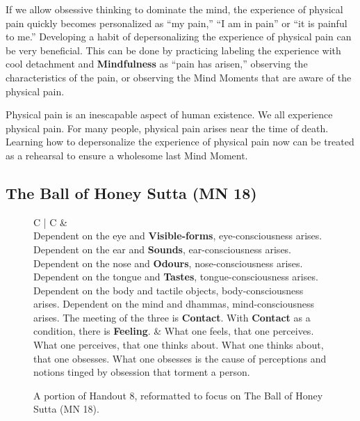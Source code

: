 If we allow obsessive thinking to dominate the mind, the experience of physical pain quickly becomes personalized as “my pain,” “I am in pain” or “it is painful to me.” Developing a habit of depersonalizing the experience of physical pain can be very beneficial. This can be done by practicing labeling the experience with cool detachment and \textbf{Mindfulness} as “pain has arisen,” observing the characteristics of the pain, or observing the Mind Moments that are aware of the physical pain.

Physical pain is an inescapable aspect of human existence. We all experience physical pain. For many people, physical pain arises near the time of death. Learning how to depersonalize the experience of physical pain now can be treated as a rehearsal to ensure a wholesome last Mind Moment.

\subsection*{The Ball of Honey Sutta (MN 18)}

\begin{figure}[H]
\begin{tabular*}{\textwidth}{C{\tabcolsep} | C{\tabcolsep}}
\toprule
{} &  \\
\midrule
 Dependent on the eye and \textbf{Visible-forms}, eye-consciousness arises.\newline
 Dependent on the ear and \textbf{Sounds}, ear-consciousness arises.\newline
 Dependent on the nose and \textbf{Odours}, nose-consciousness arises.\newline
 Dependent on the tongue and \textbf{Tastes}, tongue-consciousness arises.\newline
 Dependent on the body and tactile objects, body-consciousness arises.\newline
 Dependent on the mind and dhammas, mind-consciousness arises.
 \newline\vspace{5mm}
 The meeting of the three is \textbf{Contact}.
 \newline\vspace{5mm}
 With \textbf{Contact} as a condition, there is \textbf{Feeling}.
 &
 What one feels, that one perceives.\newline
 What one perceives, that one thinks about.\newline
 What one thinks about, that one obsesses.\newline
 What one obsesses is the cause of perceptions and notions tinged by obsession that torment a person.
 \\
 
\bottomrule
\end{tabular*}
\caption{A portion of Handout 8, reformatted to focus on The Ball of Honey Sutta (MN 18).}
\end{figure}

